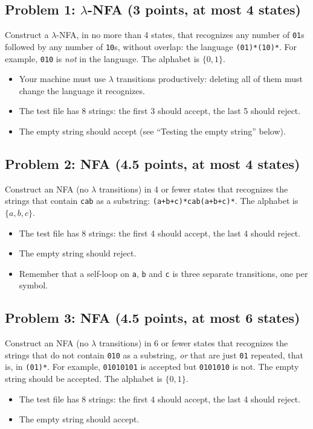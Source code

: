 \documentclass[11pt]{article}
\newcommand{\re}[1]{\texttt{#1}}
\begin{document}
\subsection*{Problem 1: $\lambda$-NFA (3 points, at most 4 states)}
Construct a $\lambda$-NFA, in no more than 4 states, that recognizes any number of \texttt{01}s
followed by any number of \texttt{10}s, without overlap: the language \re{(01)*(10)*}. For
example, \texttt{010} is \emph{not} in the language. The alphabet is $\{0,1\}$.
\begin{itemize}
  \item Your machine must use $\lambda$ transitions productively: deleting all of them must
        change the language it recognizes.
  \item The test file has 8 strings: the first 3 should accept, the last 5 should reject.
  \item The empty string should accept (see ``Testing the empty string'' below).
\end{itemize}

\subsection*{Problem 2: NFA (4.5 points, at most 4 states)}
Construct an NFA (no $\lambda$ transitions) in 4 or fewer states that recognizes the strings that contain \texttt{cab} as a
substring: \re{(a+b+c)*cab(a+b+c)*}. The alphabet is $\{a,b,c\}$.
\begin{itemize}
  \item The test file has 8 strings: the first 4 should accept, the last 4 should reject.
  \item The empty string should reject.
  \item Remember that a self-loop on \texttt{a}, \texttt{b} and \texttt{c} is three separate
        transitions, one per symbol.
\end{itemize}

\subsection*{Problem 3: NFA (4.5 points, at most 6 states)}
Construct an NFA (no $\lambda$ transitions) in 6 or fewer states that recognizes the strings that do not contain
\texttt{010} as a substring, \emph{or} that are just \texttt{01} repeated, that is, in
\re{(01)*}. For example, \texttt{01010101} is accepted but \texttt{0101010} is not. The empty
string should be accepted. The alphabet is $\{0,1\}$.
\begin{itemize}
  \item The test file has 8 strings: the first 4 should accept, the last 4 should reject.
  \item The empty string should accept.
\end{itemize}
\end{document}
